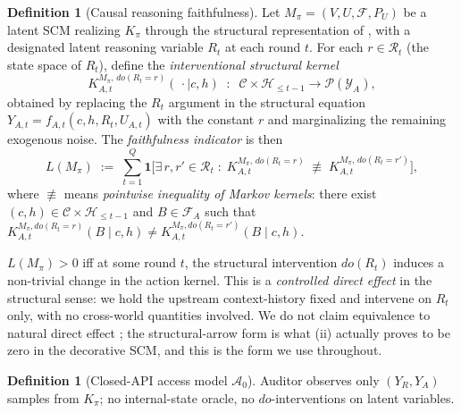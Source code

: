 \documentclass{article}
\theoremstyle{plain}
\theoremstyle{definition}
\newtheorem{definition}[theorem]{Definition}
\theoremstyle{remark}
\newcommand{\C}{\mathcal{C}}
\newcommand{\Y}{\mathcal{Y}}
\newcommand{\Hist}{\mathcal{H}}
\begin{document}
\begin{definition}[Causal reasoning faithfulness]\label{def:L}
Let $M_\pi = (V, U, \mathcal{F}, P_U)$ be a latent SCM realizing $K_\pi$
through the structural representation of , with a designated
latent reasoning variable $R_t$ at each round $t$. For each $r \in \mathcal R_t$
(the state space of $R_t$), define the \emph{interventional structural kernel}
\[
K^{M_\pi,\, do(R_t = r)}_{A, t}(\,\cdot \mid c, h)
\;\;:\;\;
\C \times \Hist_{\le t-1} \to \mathcal P(\Y_A),
\]
obtained by replacing the $R_t$ argument in the structural equation
$Y_{A,t} = f_{A,t}(c, h, R_t, U_{A,t})$ with the constant $r$ and
marginalizing the remaining exogenous noise. The \emph{faithfulness
indicator} is then
\[
L(M_\pi) \;:=\; \sum_{t=1}^Q \mathbf{1}\!\Big[
  \exists\, r, r' \in \mathcal R_t \;:\;
  K^{M_\pi,\, do(R_t = r)}_{A, t} \;\not\equiv\;
  K^{M_\pi,\, do(R_t = r')}_{A, t}
\Big],
\]
where $\not\equiv$ means \emph{pointwise inequality of Markov kernels}:
there exist $(c, h) \in \C \times \Hist_{\le t-1}$ and $B \in \mathcal F_A$
such that
$K^{M_\pi, do(R_t = r)}_{A, t}(B \mid c, h) \neq K^{M_\pi, do(R_t = r')}_{A, t}(B \mid c, h)$.

\smallskip
$L(M_\pi) > 0$ iff at some round $t$, the structural intervention $do(R_t)$
induces a non-trivial change in the action kernel. This is a
\emph{controlled direct effect} in the structural sense: we hold the
upstream context-history fixed and intervene on $R_t$ only, with no
cross-world quantities involved. We do not claim equivalence to natural
direct effect \citep{pearl2001direct}; the structural-arrow form is what
(ii) actually proves to be zero in the
decorative SCM, and this is the form we use throughout.
\end{definition}

\begin{definition}[Closed-API access model $\mathcal{A}_0$]\label{def:A0}
Auditor observes only $(Y_R, Y_A)$ samples from $K_\pi$; no internal-state
oracle, no $\mathit{do}$-interventions on latent variables.
\end{definition}
\end{document}

